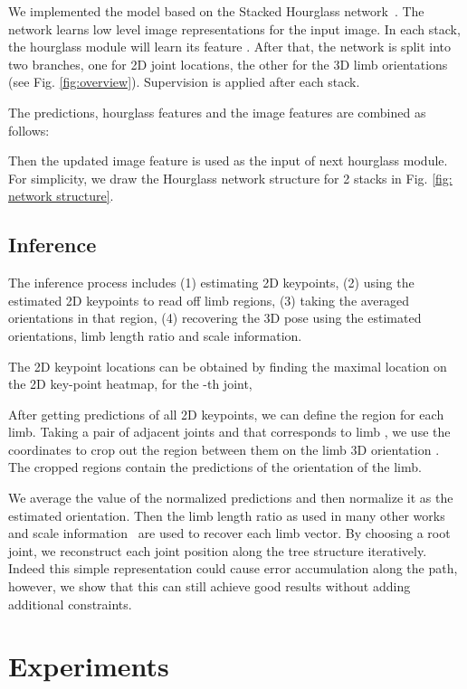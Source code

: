 \documentclass{bmvc2k}
\begin{document}
We implemented the model based on the Stacked Hourglass network~\cite{newell2016stacked}.
The network learns low level image representations  for the input image.
In each stack, the hourglass module will learn its feature .
After that, the network is split into two branches, one for 2D joint locations, the other for the 3D limb orientations (see Fig. \ref{fig:overview}).
Supervision is applied after each stack.

The predictions, hourglass features and the image features are combined as follows:

Then the updated image feature  is used as the input of next hourglass module.
For simplicity, we draw the Hourglass network structure for 2 stacks in Fig. \ref{fig: network structure}.



\subsection{Inference}
The inference process includes 
(1) estimating 2D keypoints,
(2) using the estimated 2D keypoints to read off limb regions, 
(3) taking the averaged orientations in that region,
(4) recovering the 3D pose using the estimated orientations, limb length ratio and scale information.

The 2D keypoint locations can be obtained by finding the maximal location on the 2D key-point heatmap, for the -th joint, 



After getting predictions of all 2D keypoints, we can define the region for each limb.
Taking a pair of adjacent joints  and  that corresponds to limb ,
we use the coordinates to crop out the region between them on the limb 3D orientation 
 . The cropped regions contain the predictions of the orientation of the  limb.

We average the value of the normalized predictions and then normalize it as the estimated orientation.
Then the limb length ratio as used in many other works~\cite{zhou2017weakly,wang2014robust} and scale information~\cite{zhou2016sparseness,zhou2017weakly,martinez2017simple,sun2017compositional} are used to recover each limb vector. 
By choosing a root joint, we reconstruct each joint position along the tree structure iteratively. Indeed this simple representation could cause error accumulation along the path, however, we show that this can still achieve good results without adding additional constraints.

\section{Experiments}
\end{document}
